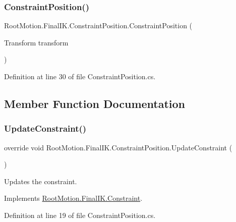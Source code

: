 \subsubsection{\texorpdfstring{Constraint\+Position()}{ConstraintPosition()}\hspace{0.1cm}{\footnotesize\ttfamily [2/2]}}
{\footnotesize\ttfamily Root\+Motion.\+Final\+I\+K.\+Constraint\+Position.\+Constraint\+Position (\begin{DoxyParamCaption}\item[{Transform}]{transform }\end{DoxyParamCaption})}



Definition at line 30 of file Constraint\+Position.\+cs.



\subsection{Member Function Documentation}
\mbox{\label{class_root_motion_1_1_final_i_k_1_1_constraint_position_a872cfb0d7c9de48b4848fcc931e838c1}} 
\subsubsection{\texorpdfstring{Update\+Constraint()}{UpdateConstraint()}}
{\footnotesize\ttfamily override void Root\+Motion.\+Final\+I\+K.\+Constraint\+Position.\+Update\+Constraint (\begin{DoxyParamCaption}{ }\end{DoxyParamCaption})\hspace{0.3cm}{\ttfamily [virtual]}}



Updates the constraint. 



Implements \mbox{\hyperlink{class_root_motion_1_1_final_i_k_1_1_constraint_a3abc634189f065586d8d57c653c22fdd}{Root\+Motion.\+Final\+I\+K.\+Constraint}}.



Definition at line 19 of file Constraint\+Position.\+cs.




